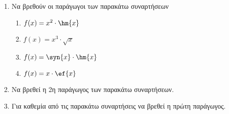 \begin{enumerate}
\item 
Να βρεθούν οι παράγωγοι των παρακάτω συναρτήσεων
\begin{enumerate}
\item $ f(x)=x^2\cdot\hm{x} $
\item $ f(x)=x^3\cdot\sqrt{x} $
\item $ f(x)=\syn{x}\cdot\hm{x} $
\item $ f(x)=x\cdot\ef{x} $
\end{enumerate}
\item 
Να βρεθεί η 2η παράγωγος των παρακάτω συναρτήσεων.
\begin{multicols}{2}
\end{multicols}
\item 
Για καθεμία από τις παρακάτω συναρτήσεις να βρεθεί η πρώτη παράγωγος.
\begin{multicols}{2}
\end{multicols}



\end{enumerate}
